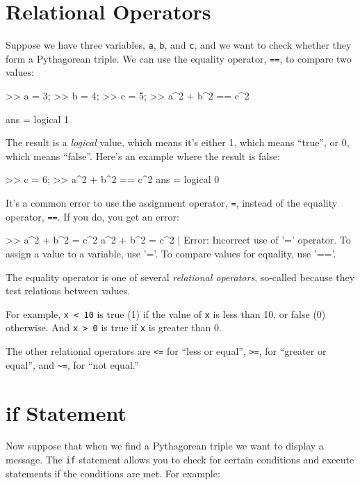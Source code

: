 \section{Relational Operators}

Suppose we have three variables, {\tt a}, {\tt b}, and {\tt c}, and we want to check whether they form a Pythagorean triple.  We can use the equality operator, {\tt ==}, to compare two values:

\begin{code}
>> a = 3;
>> b = 4;
>> c = 5;
>> a^2 + b^2 == c^2

ans = logical 1
\end{code}

The result is a {\em logical} value, which means it's either 1, which means ``true'', or 0, which means ``false''.  Here's an example where the result is false:

\begin{code}
>> c = 6;
>> a^2 + b^2 == c^2
ans = logical 0
\end{code}

It's a common error to use the assignment operator, {\tt =}, instead of the equality operator, {\tt ==}.  If you do, you get an error:

\begin{code}
>> a^2 + b^2 = c^2
 a^2 + b^2 = c^2
           |
Error: Incorrect use of '=' operator. 
To assign a value to a variable, use '='. 
To compare values for equality, use '=='.
\end{code}

The equality operator is one of several {\em relational operators}, so-called because they test relations between values.

For example, {\tt x < 10} is true (1) if the value of {\tt x} is less than 10, or false (0) otherwise.  And {\tt x > 0} is true if {\tt x} is greater than 0.

The other relational operators are {\tt <=} for ``less or equal'', {\tt >=}, for ``greater or equal'', and  \verb+~=+, for ``not equal.''


\section{if Statement}


Now suppose that when we find a Pythagorean triple we want to display a message.
The {\tt if} statement allows you to check for certain conditions
and execute statements if the conditions are met.  For example:

